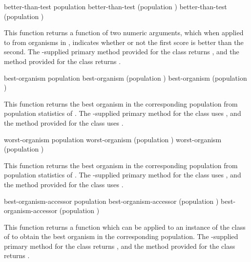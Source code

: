 {\filbreak

{\samepage
\Defgeneric better-than-test {population}
 better-than-test {(population )}
 better-than-test {(population )}

This function returns a function of two numeric arguments, which when applied to
 from organisms in , indicates whether or not the first
score is better than the second. The \geco-supplied primary method provided
for the  class returns , and the method
provided for the  class returns .
\par}%

\filbreak

{\samepage
\Defgeneric best-organism {population}
 best-organism {(population )}
 best-organism {(population )}

This function returns the best organism in the corresponding population from
population statistics of . The \geco-supplied primary method for the
 class uses , and the method
provided for the  class uses .
\par}%

\filbreak

{\samepage
\Defgeneric worst-organism {population}
 worst-organism {(population )}
 worst-organism {(population )}

This function returns the best organism in the corresponding population from
population statistics of . The \geco-supplied primary method for the
 class uses , and the method
provided for the  class uses .
\par}%

\filbreak

{\samepage
\Defgeneric best-organism-accessor {population}
 best-organism-accessor {(population )}
 best-organism-accessor {(population )}

This function returns a function which can be applied to an instance of the
 class of  to obtain the best organism in the
corresponding population. The \geco-supplied primary method for the
 class returns ,
and the method provided for the  class returns
.
\par}%

}
